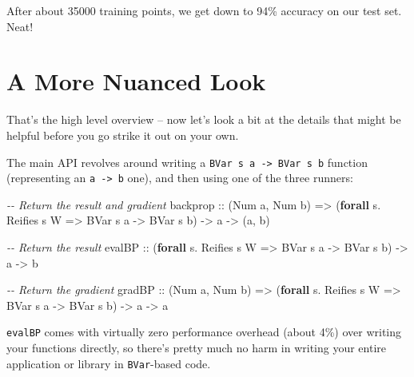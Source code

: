 \documentclass[]{article}
\newenvironment{Shaded}{}{}
\newcommand{\CommentTok}[1]{\textcolor[rgb]{0.38,0.63,0.69}{\textit{#1}}}
\newcommand{\DataTypeTok}[1]{\textcolor[rgb]{0.56,0.13,0.00}{#1}}
\newcommand{\KeywordTok}[1]{\textcolor[rgb]{0.00,0.44,0.13}{\textbf{#1}}}
\newcommand{\NormalTok}[1]{#1}
\newcommand{\OperatorTok}[1]{\textcolor[rgb]{0.40,0.40,0.40}{#1}}
\newcommand{\OtherTok}[1]{\textcolor[rgb]{0.00,0.44,0.13}{#1}}
\begin{document}
After about 35000 training points, we get down to 94\% accuracy on our test set.
Neat!

\section{A More Nuanced Look}\label{a-more-nuanced-look}

That's the high level overview -- now let's look a bit at the details that might
be helpful before you go strike it out on your own.

The main API revolves around writing a
\texttt{BVar\ s\ a\ -\textgreater{}\ BVar\ s\ b} function (representing an
\texttt{a\ -\textgreater{}\ b} one), and then using one of the three runners:

\begin{Shaded}
\begin{Highlighting}[]
\CommentTok{{-}{-} Return the result and gradient}
\OtherTok{backprop ::}\NormalTok{ (}\DataTypeTok{Num}\NormalTok{ a, }\DataTypeTok{Num}\NormalTok{ b)}
         \OtherTok{=\textgreater{}}\NormalTok{ (}\KeywordTok{forall}\NormalTok{ s}\OperatorTok{.} \DataTypeTok{Reifies}\NormalTok{ s }\DataTypeTok{W} \OtherTok{=\textgreater{}} \DataTypeTok{BVar}\NormalTok{ s a }\OtherTok{{-}\textgreater{}} \DataTypeTok{BVar}\NormalTok{ s b) }\OtherTok{{-}\textgreater{}}\NormalTok{ a }\OtherTok{{-}\textgreater{}}\NormalTok{ (a, b)}

\CommentTok{{-}{-} Return the result}
\OtherTok{evalBP   ::}\NormalTok{ (}\KeywordTok{forall}\NormalTok{ s}\OperatorTok{.} \DataTypeTok{Reifies}\NormalTok{ s }\DataTypeTok{W} \OtherTok{=\textgreater{}} \DataTypeTok{BVar}\NormalTok{ s a }\OtherTok{{-}\textgreater{}} \DataTypeTok{BVar}\NormalTok{ s b) }\OtherTok{{-}\textgreater{}}\NormalTok{ a }\OtherTok{{-}\textgreater{}}\NormalTok{ b}

\CommentTok{{-}{-} Return the gradient}
\OtherTok{gradBP   ::}\NormalTok{ (}\DataTypeTok{Num}\NormalTok{ a, }\DataTypeTok{Num}\NormalTok{ b)}
         \OtherTok{=\textgreater{}}\NormalTok{ (}\KeywordTok{forall}\NormalTok{ s}\OperatorTok{.} \DataTypeTok{Reifies}\NormalTok{ s }\DataTypeTok{W} \OtherTok{=\textgreater{}} \DataTypeTok{BVar}\NormalTok{ s a }\OtherTok{{-}\textgreater{}} \DataTypeTok{BVar}\NormalTok{ s b) }\OtherTok{{-}\textgreater{}}\NormalTok{ a }\OtherTok{{-}\textgreater{}}\NormalTok{ a}
\end{Highlighting}
\end{Shaded}

\texttt{evalBP} comes with virtually zero performance overhead (about 4\%) over
writing your functions directly, so there's pretty much no harm in writing your
entire application or library in \texttt{BVar}-based code.
\end{document}
